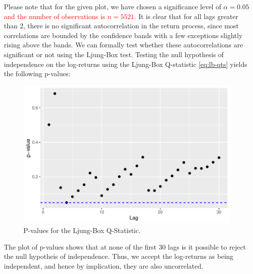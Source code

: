 Please note that for the given plot, we have chosen a significance level of $\alpha=0.05$ \textcolor{red}{and the number of observations is $n=5521$.} It is clear that for all lags greater than 2, there is no significant autocorrelation in the return process, since most correlations are bounded by the confidence bands with a few exceptions slightly rising above the bands. We can formally test whether these autocorrelations are significant or not using the Ljung-Box test. Testing the null hypothesis of independence on the log-returns using the Ljung-Box Q-statistic \eqref{eq:lb-qts} yields the following p-values: 
\begin{figure}[H]
    \centering
    \includegraphics[scale=0.7]{fig/img/ny_ljnugbox_ggplot.pdf}
    \caption{P-values for the Ljung-Box Q-Statistic.}
    \label{fig:ljungbox}
\end{figure}
The plot of p-values shows that at none of the first 30 lags is it possible to reject the null hypotheis of independence.
Thus, we accept the log-returns as being independent, and hence by implication, they are also uncorrelated. 

